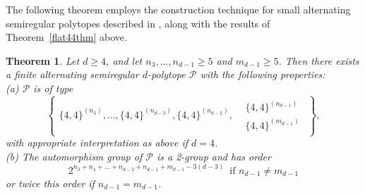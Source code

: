 \documentclass[12pt]{amsart}
\newtheorem{theorem}{Theorem}[section]
\theoremstyle{definition}
\begin{document}
The following theorem employs the construction technique for small alternating semiregular polytopes described in \cite[Thm. 5.3]{MonSch2020}, along with the results of Theorem~\ref{flat44thm} above.

\begin{theorem}
\label{44semiregularthm}
Let $d\geq 4$, and let $n_3,\ldots,n_{d-1}\geq 5$ and $m_{d-1}\geq 5$. Then there exists a finite alternating semiregular $d$-polytope $\mathcal P$ with the following properties:\\[.02in]
(a) $\mathcal P$ is of type 
\[\left\{\!\!\begin{array}{rl}
\{4,4\}^{(n_3)},\ldots,\{4,4\}^{(n_{d-3})},\{4,4\}^{(n_{d-2})},
&\!\!\!\!\!\!\begin{array}{l}
\{4,4\}^{(n_{d-1})}\\[.1in]
\{4,4\}^{(m_{d-1})}
\end{array}
\end{array}\!\!\!\!\!\right\},\]
with appropriate interpretation as above if $d=4$.\\[.02in]
(b) The automorphism group of $\mathcal P$ is a 2-group and has order 
\[2^{n_3+n_4+\ldots+n_{d-2} +n_{d-1}+m_{d-1}-3(d-3)}\,\mbox{ if } n_{d-1}\neq m_{d-1}\]
or twice this order if $n_{d-1}=m_{d-1}$.
\end{theorem}
\end{document}
